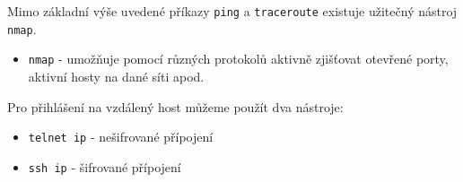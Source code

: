 Mimo základní výše uvedené příkazy \texttt{ping} a \texttt{traceroute}
existuje užitečný nástroj \texttt{nmap}.

\begin{itemize}
				\item \texttt{nmap} - umožňuje pomocí různých protokolů aktivně zjišťovat otevřené porty, aktivní hosty na dané síti apod.
\end{itemize}


Pro přihlášení na vzdálený host můžeme použít dva nástroje:
\begin{itemize}
				\item \texttt{telnet ip} - nešifrované přípojení
				\item \texttt{ssh ip} - šifrované přípojení
\end{itemize}



